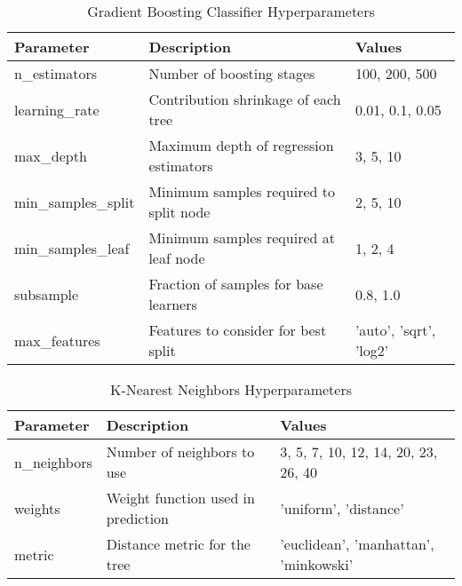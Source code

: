 			\begin{table}[htbp]
				\centering
				\begin{tabular}{|l|l|l|}
					\hline
					\textbf{Parameter} & \textbf{Description}                   & \textbf{Values}        \\
					\hline
					n\_estimators           & Number of boosting stages              & 100, 200, 500          \\
					learning\_rate          & Contribution shrinkage of each tree    & 0.01, 0.1, 0.05        \\
					max\_depth              & Maximum depth of regression estimators & 3, 5, 10               \\
					min\_samples\_split     & Minimum samples required to split node & 2, 5, 10               \\
					min\_samples\_leaf      & Minimum samples required at leaf node  & 1, 2, 4                \\
					subsample               & Fraction of samples for base learners  & 0.8, 1.0               \\
					max\_features           & Features to consider for best split    & 'auto', 'sqrt', 'log2' \\
					\hline
				\end{tabular}
				\caption{Gradient Boosting Classifier Hyperparameters}
				\label{tab:gradient-boosting-params}
			\end{table}

			\begin{table}[htbp]
				\centering
				\begin{tabular}{|l|l|l|}
					\hline
					\textbf{Parameter} & \textbf{Description} & \textbf{Values} \\
					\hline
					n\_neighbors & Number of neighbors to use & 3, 5, 7, 10, 12, 14, 20, 23, 26, 40
					\\
					weights & Weight function used in prediction & 'uniform', 'distance'
					\\
					metric & Distance metric for the tree & 'euclidean', 'manhattan', 'minkowski'
					\\
					\hline
				\end{tabular}
				\caption{K-Nearest Neighbors Hyperparameters}
				\label{tab:knn-params}
			\end{table}

